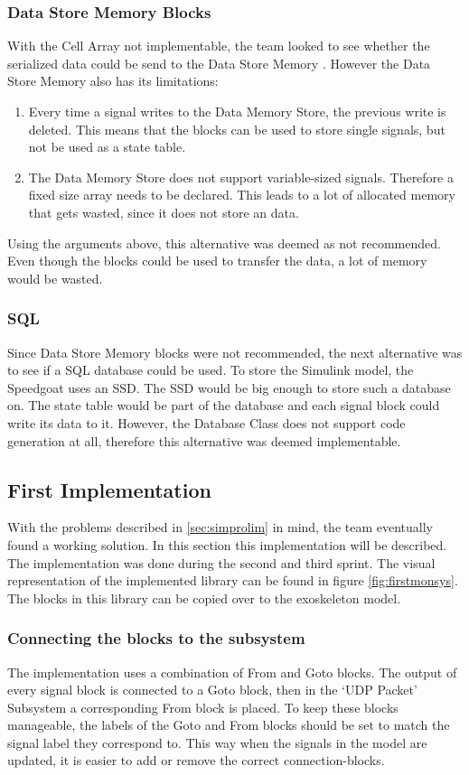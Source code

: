 \subsubsection{Data Store Memory Blocks}
With the Cell Array not implementable, the team looked to see whether the serialized data could be send to the Data Store Memory \cite{web:datastore}. However the Data Store Memory also has its limitations:
\begin{enumerate}
	\item Every time a signal writes to the Data Memory Store, the previous write is deleted. This means that the blocks can be used to store single signals, but not be used as a state table.
	\item The Data Memory Store does not support variable-sized signals. Therefore a fixed size array needs to be declared. This leads to a lot of allocated memory that gets wasted, since it does not store an data.
\end{enumerate}
Using the arguments above, this alternative was deemed as not recommended. Even though the blocks could be used to transfer the data, a lot of memory would be wasted.

\subsubsection{SQL}
Since Data Store Memory blocks were not recommended, the next alternative was to see if a SQL database could be used. To store the Simulink model, the Speedgoat uses an SSD. The SSD would be big enough to store such a database on. The state table would be part of the database and each signal block could write its data to it. However, the Database Class does not support code generation at all, therefore this alternative was deemed implementable.

\subsection{First Implementation}\label{sec:simfirim}
With the problems described in \ref{sec:simprolim} in mind, the team eventually found a working solution. In this section this implementation will be described. The implementation was done during the second and third sprint. The visual representation of the implemented library can be found in figure \ref{fig:firstmonsys}. The blocks in this library can be copied over to the exoskeleton model.

\subsubsection{Connecting the blocks to the subsystem}
The implementation uses a combination of From \cite{web:from} and Goto \cite{web:goto} blocks. The output of every signal block is connected to a Goto block, then in the `UDP Packet' Subsystem a corresponding From block is placed. To keep these blocks manageable, the labels of the Goto and From blocks should be set to match the signal label they correspond to. This way when the signals in the model are updated, it is easier to add or remove the correct connection-blocks.

